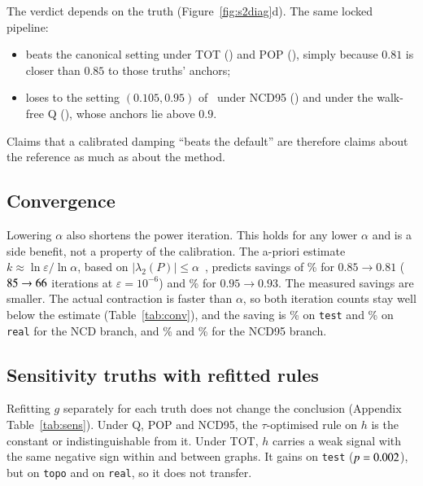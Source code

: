 \documentclass[11pt,a4paper]{article}
\theoremstyle{definition}
\theoremstyle{remark}
\begin{document}
The verdict depends on the truth (Figure~\ref{fig:s2diag}d). The same locked pipeline:
\begin{itemize}[leftmargin=1.4em,itemsep=0pt]
\item beats the canonical setting under TOT (\PipeTotTwoVsLoTest) and POP (\PipePopTwoVsLoTest), simply
because $0.81$ is closer than $0.85$ to those truths' anchors;
\item loses to the setting $(0.105,0.95)$ of~\cite{ng13} under NCD95 (\PipeNcdnfTwoVsHiTest) and under
the walk-free Q (\PipeQTwoVsHiTest), whose anchors lie above $0.9$.
\end{itemize}
Claims that a calibrated damping ``beats the default'' are therefore claims about the reference as much
as about the method.



\subsection{Convergence}
Lowering $\alpha$ also shortens the power iteration. This holds for any lower $\alpha$ and is a side
benefit, not a property of the calibration. The a-priori estimate $k\approx\ln\varepsilon/\ln\alpha$,
based on $|\lambda_2(P)|\le\alpha$~\cite{haveliwala03,ng13}, predicts savings of \ConvNcdBound\% for
$0.85\to0.81$ ($85\to66$ iterations at $\varepsilon=10^{-6}$) and \ConvNfBound\% for
$0.95\to0.93$. The measured savings are smaller. The actual contraction is faster than $\alpha$, so
both iteration counts stay well below the estimate (Table~\ref{tab:conv}), and the saving is
\ConvNcdTest\% on \texttt{test} and \ConvNcdReal\% on \texttt{real} for the NCD branch, and \ConvNfTest\%
and \ConvNfReal\% for the NCD95 branch.



\subsection{Sensitivity truths with refitted rules}
Refitting $g$ separately for each truth does not change the conclusion (Appendix
Table~\ref{tab:sens}). Under Q, POP and NCD95, the $\tau$-optimised rule on $h$ is the constant or
indistinguishable from it. Under TOT, $h$ carries a weak signal with the same negative sign within and
between graphs. It gains \TotHTest{} on \texttt{test} ($p=0.002$), but \TotHTopo{} on \texttt{topo}
and \TotHReal{} on \texttt{real}, so it does not transfer.
\end{document}
